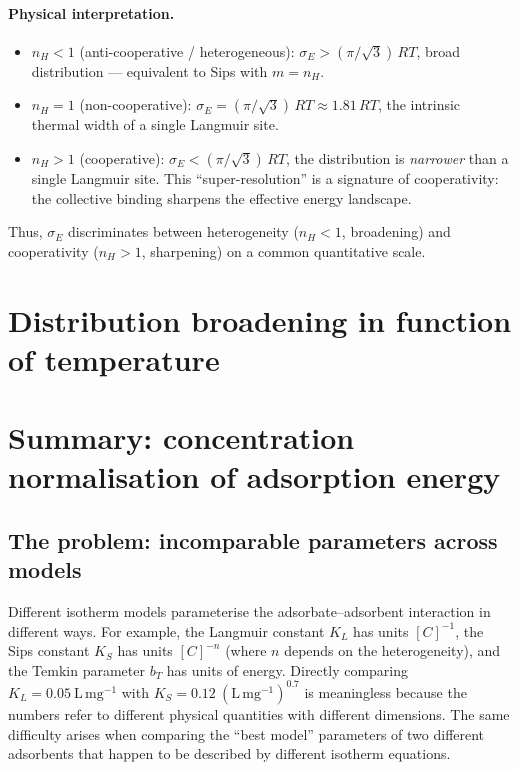 \documentclass[12pt]{article}
\begin{document}
	\paragraph{Physical interpretation.}
	\begin{itemize}
		\item $n_H < 1$ (anti-cooperative / heterogeneous):
		$\sigma_E > (\pi/\sqrt{3})\,RT$, broad distribution ---
		equivalent to Sips with $m = n_H$.
		\item $n_H = 1$ (non-cooperative):
		$\sigma_E = (\pi/\sqrt{3})\,RT \approx 1.81\,RT$,
		the intrinsic thermal width of a single Langmuir site.
		\item $n_H > 1$ (cooperative):
		$\sigma_E < (\pi/\sqrt{3})\,RT$, the distribution is
		\emph{narrower} than a single Langmuir site.  This
		``super-resolution'' is a signature of cooperativity:
		the collective binding sharpens the effective energy
		landscape.
	\end{itemize}
	Thus, $\sigma_E$ discriminates between heterogeneity
	($n_H < 1$, broadening) and cooperativity ($n_H > 1$,
	sharpening) on a common quantitative scale.

	\section{Distribution broadening in function of temperature}

	\section{Summary: concentration normalisation of adsorption energy}

	\subsection{The problem: incomparable parameters across models}

	Different isotherm models parameterise the adsorbate--adsorbent
	interaction in different ways.  For example, the Langmuir constant
	$K_L$ has units $[C]^{-1}$, the Sips constant $K_S$ has units
	$[C]^{-n}$ (where $n$ depends on the heterogeneity), and the Temkin
	parameter $b_T$ has units of energy.
	Directly comparing $K_L = 0.05~\mathrm{L\,mg^{-1}}$ with
	$K_S = 0.12~\mathrm{(L\,mg^{-1})^{0.7}}$ is meaningless because
	the numbers refer to different physical quantities with different
	dimensions.  The same difficulty arises when comparing the ``best
	model'' parameters of two different adsorbents that happen to be
	described by different isotherm equations.
\end{document}
